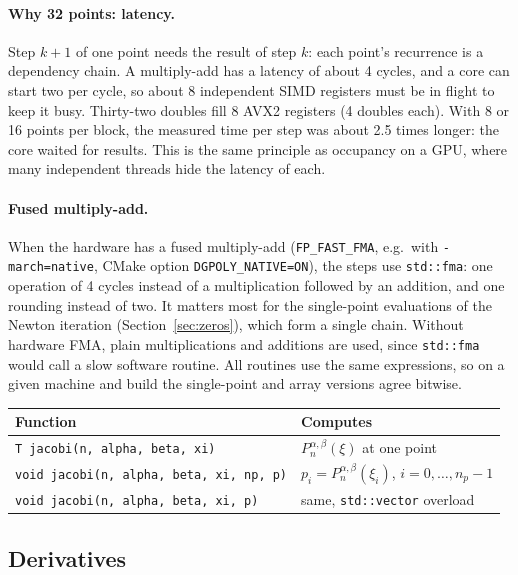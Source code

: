 \documentclass[11pt,a4paper]{article}
\newcommand{\Pab}[1]{P_{#1}^{\alpha,\beta}}     %
\newcommand{\code}[1]{\texttt{#1}}
\begin{document}
\paragraph{Why 32 points: latency.}
Step $k+1$ of one point needs the result of step $k$: each point's recurrence
is a dependency chain. A multiply-add has a latency of about 4 cycles, and a
core can start two per cycle, so about 8 independent SIMD registers must be in
flight to keep it busy. Thirty-two doubles fill 8 AVX2 registers (4 doubles
each). With 8 or 16 points per block, the measured time per step was about
2.5 times longer: the core waited for results. This is the same principle as
occupancy on a GPU, where many independent threads hide the latency of each.

\paragraph{Fused multiply-add.}
When the hardware has a fused multiply-add (\code{FP\_FAST\_FMA}, e.g.\ with
\code{-march=native}, CMake option \code{DGPOLY\_NATIVE=ON}), the steps
use \code{std::fma}: one operation of 4 cycles instead of a multiplication
followed by an addition, and one rounding instead of two. It matters most for
the single-point evaluations of the Newton iteration (Section~\ref{sec:zeros}),
which form a single chain. Without hardware FMA, plain multiplications and
additions are used, since \code{std::fma} would call a slow software routine.
All routines use the same expressions, so on a given machine and build the
single-point and array versions agree bitwise.

\begin{center}
\begin{tabular}{@{}ll@{}}
\toprule
Function & Computes \\
\midrule
\code{T jacobi(n, alpha, beta, xi)} & $\Pab{n}(\xi)$ at one point \\
\code{void jacobi(n, alpha, beta, xi, np, p)} & $p_i=\Pab{n}(\xi_i)$, $i=0,\dots,n_p-1$ \\
\code{void jacobi(n, alpha, beta, xi, p)} & same, \code{std::vector} overload \\
\bottomrule
\end{tabular}
\end{center}

\subsection{Derivatives}
\label{sec:deriv}
\end{document}
